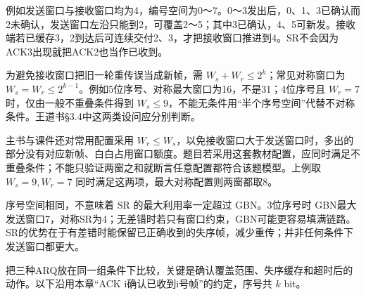 例如发送窗口与接收窗口均为4，编号空间为0～7。0～3发出后，0、1、3已确认而2未确认，发送窗口左沿只能到2，可覆盖2～5；其中3已确认，4、5可新发。接收端若已缓存3，2到达后可连续交付2、3，才把接收窗口推进到4。SR不会因为ACK3出现就把ACK2也当作已收到。

为避免接收窗口把旧一轮重传误当成新帧，需 \(W_s+W_r\le2^k\)；常见对称窗口为 \(W_s=W_r\le2^{k-1}\)。例如5位序号、对称最大窗口为16，不是31；4位序号且 \(W_r=7\) 时，仅由一般不重叠条件得到 \(W_s\le9\)，不能无条件用``半个序号空间''代替不对称条件。王道书§3.4中这两类设问应分别判断。

主书与课件还对常用配置采用 \(W_r\le W_s\)，以免接收窗口大于发送窗口时，多出的部分没有对应新帧、白白占用窗口额度。题目若采用这套教材配置，应同时满足不重叠条件；不能只验证两窗之和就断言任意配置都符合该题模型。上例取 \(W_s=9,W_r=7\) 同时满足这两项，最大对称配置则两窗都取8。

序号空间相同，不意味着 SR 的最大利用率一定超过 GBN。3位序号时 GBN最大发送窗口7，对称SR为4；无差错时若只有窗口约束，GBN可能更容易填满链路。SR的优势在于有差错时能保留已正确收到的失序帧，减少重传；并非任何条件下发送窗口都更大。

把三种ARQ放在同一组条件下比较，关键是确认覆盖范围、失序缓存和超时后的动作。以下沿用本章``ACK i确认已收到i号帧''的约定，序号共 \(k\) bit。

